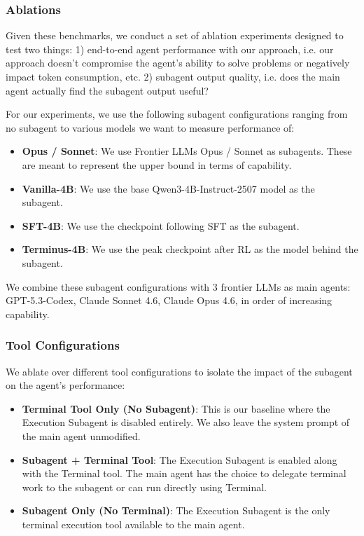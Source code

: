 \documentclass[sigconf,review]{acmart}
\begin{document}
\subsubsection{Ablations}
Given these benchmarks, we conduct a set of ablation experiments designed to test two things: 1) end-to-end agent performance with our approach, i.e. our approach doesn't compromise the agent's ability to solve problems or negatively impact token consumption, etc. 2) subagent output quality, i.e. does the main agent actually find the subagent output useful?

For our experiments, we use the following subagent configurations ranging from no subagent to various models we want to measure performance of:
\begin{itemize}
    \item \textbf{Opus / Sonnet}: We use Frontier LLMs Opus / Sonnet as subagents. These are meant to represent the upper bound in terms of capability.
    \item \textbf{Vanilla-4B}: We use the base Qwen3-4B-Instruct-2507 model as the subagent.
    \item \textbf{SFT-4B}: We use the checkpoint following SFT as the subagent.
    \item \textbf{Terminus-4B}: We use the peak checkpoint after RL as the model behind the subagent.
\end{itemize}

We combine these subagent configurations with 3 frontier LLMs as main agents: GPT-5.3-Codex, Claude Sonnet 4.6, Claude Opus 4.6, in order of increasing capability.

\subsubsection{Tool Configurations}
We ablate over different tool configurations to isolate the impact of the subagent on the agent's performance:
\begin{itemize}
    \item \textbf{Terminal Tool Only (No Subagent)}: This is our baseline where the Execution Subagent is disabled entirely. We also leave the system prompt of the main agent unmodified.
    \item \textbf{Subagent + Terminal Tool}: The Execution Subagent is enabled along with the Terminal tool. The main agent has the choice to delegate terminal work to the subagent or can run directly using Terminal.
    \item \textbf{Subagent Only (No Terminal)}: The Execution Subagent is the only terminal execution tool available to the main agent.
\end{itemize}
\end{document}
